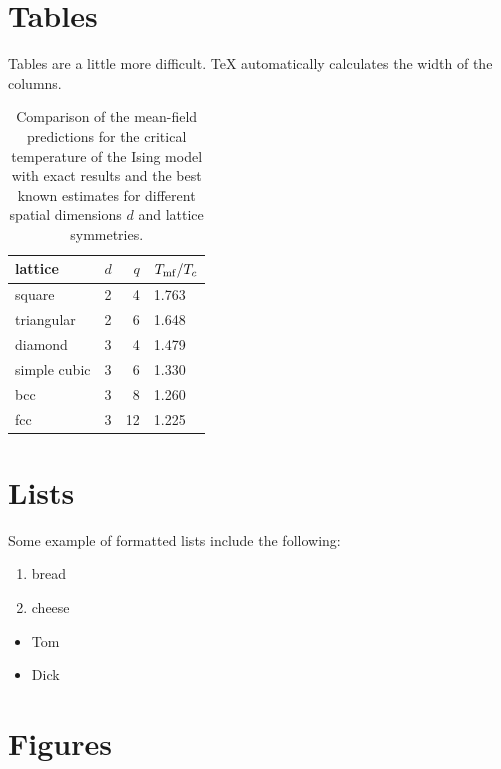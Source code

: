 \documentclass[prb,12pt]{revtex4}
\begin{document}
\section{Tables}
Tables are a little more difficult. TeX
automatically calculates the width of the columns.

\begin{table}[h]
\begin{center}
\begin{tabular}{|l|l|r|l|}
\hline
lattice & $d$ & $q$ & $T_{\rm mf}/T_c$ \\
\hline
square & 2 & 4 & 1.763 \\
\hline
triangular & 2 & 6 & 1.648 \\
\hline
diamond & 3 & 4 & 1.479 \\
\hline
simple cubic & 3 & 6 & 1.330 \\
\hline
bcc & 3 & 8 & 1.260 \\
\hline
fcc & 3 & 12 & 1.225 \\
\hline
\end{tabular}
\caption{\label{tab:5/tc}Comparison of the mean-field predictions
for the critical temperature of the Ising model with exact results
and the best known estimates for different spatial dimensions $d$
and lattice symmetries.}
\end{center}
\end{table}

\section{Lists}

Some example of formatted lists include the
following:

\begin{enumerate}

\item bread

\item cheese

\end{enumerate}

\begin{itemize}

\item Tom

\item Dick

\end{itemize}

\section{Figures}
\end{document}
